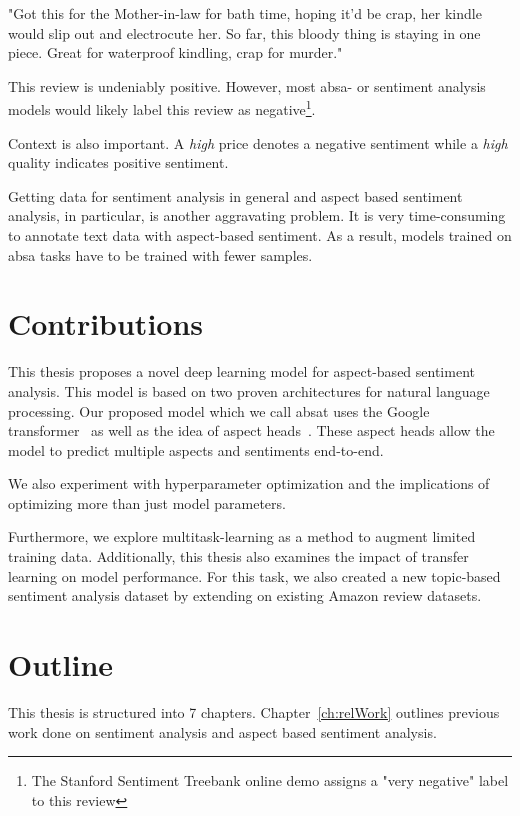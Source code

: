 \begin{center}
    "Got this for the Mother-in-law for bath time, hoping it'd be crap, her kindle would slip out and electrocute her. So far, this bloody thing is staying in one piece. Great for waterproof kindling, crap for murder."
\end{center}

This review is undeniably positive. However, most \gls{absa}- or sentiment analysis models would likely label this review as negative\footnote{The Stanford Sentiment Treebank online demo assigns a "very negative" label to this review}.

Context is also important. A \textit{high} price denotes a negative sentiment while a \textit{high} quality indicates positive sentiment.
\medskip

Getting data for sentiment analysis in general and aspect based sentiment analysis, in particular, is another aggravating problem. It is very time-consuming to annotate text data with aspect-based sentiment. As a result, models trained on \gls{absa} tasks have to be trained with fewer samples.

\section{Contributions}

This thesis proposes a novel deep learning model for aspect-based sentiment analysis. This model is based on two proven architectures for natural language processing. Our proposed model which we call \acrfull{absat} uses the Google transformer~\cite{Vaswani2017d} as well as the idea of aspect heads~\cite{Schmitt2018}. These aspect heads allow the model to predict multiple aspects and sentiments end-to-end.
\medskip

We also experiment with hyperparameter optimization and the implications of optimizing more than just model parameters.

Furthermore, we explore multitask-learning as a method to augment limited training data. Additionally, this thesis also examines the impact of transfer learning on model performance. For this task, we also created a new topic-based sentiment analysis dataset by extending on existing Amazon review datasets.

\section{Outline}

This thesis is structured into 7 chapters. Chapter~\ref{ch:relWork} outlines previous work done on sentiment analysis and aspect based sentiment analysis.
\smallskip

